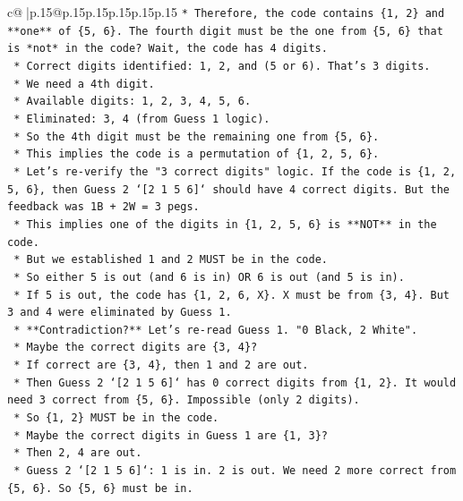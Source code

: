 \documentclass{article}
\begin{document}
{\begin{supertabular}{c@{$\;$}|p{.15\linewidth}@{}p{.15\linewidth}p{.15\linewidth}p{.15\linewidth}p{.15\linewidth}p{.15\linewidth}}
{{{\texttt{*   Therefore, the code contains \{1, 2\} and **one** of \{5, 6\}. The fourth digit must be the one from \{5, 6\} that is *not* in the code? Wait, the code has 4 digits.} \\
\texttt{    *   Correct digits identified: 1, 2, and (5 or 6). That's 3 digits.} \\
\texttt{    *   We need a 4th digit.} \\
\texttt{    *   Available digits: 1, 2, 3, 4, 5, 6.} \\
\texttt{    *   Eliminated: 3, 4 (from Guess 1 logic).} \\
\texttt{    *   So the 4th digit must be the remaining one from \{5, 6\}.} \\
\texttt{    *   This implies the code is a permutation of \{1, 2, 5, 6\}.} \\
\texttt{    *   Let's re{-}verify the "3 correct digits" logic. If the code is \{1, 2, 5, 6\}, then Guess 2 `{[}2 1 5 6{]}` should have 4 correct digits. But the feedback was 1B + 2W = 3 pegs.} \\
\texttt{    *   This implies one of the digits in \{1, 2, 5, 6\} is **NOT** in the code.} \\
\texttt{    *   But we established 1 and 2 MUST be in the code.} \\
\texttt{    *   So either 5 is out (and 6 is in) OR 6 is out (and 5 is in).} \\
\texttt{    *   If 5 is out, the code has \{1, 2, 6, X\}. X must be from \{3, 4\}. But 3 and 4 were eliminated by Guess 1.} \\
\texttt{    *   **Contradiction?** Let's re{-}read Guess 1. "0 Black, 2 White".} \\
\texttt{        *   Maybe the correct digits are \{3, 4\}?} \\
\texttt{        *   If correct are \{3, 4\}, then 1 and 2 are out.} \\
\texttt{        *   Then Guess 2 `{[}2 1 5 6{]}` has 0 correct digits from \{1, 2\}. It would need 3 correct from \{5, 6\}. Impossible (only 2 digits).} \\
\texttt{        *   So \{1, 2\} MUST be in the code.} \\
\texttt{    *   Maybe the correct digits in Guess 1 are \{1, 3\}?} \\
\texttt{        *   Then 2, 4 are out.} \\
\texttt{        *   Guess 2 `{[}2 1 5 6{]}`: 1 is in. 2 is out. We need 2 more correct from \{5, 6\}. So \{5, 6\} must be in.} \\
}}}
\end{supertabular}}
\end{document}

